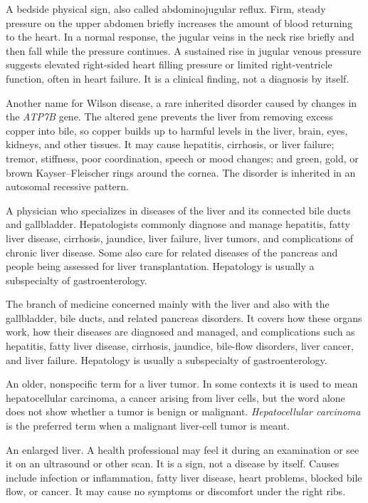  A bedside physical sign, also called abdominojugular reflux. Firm, steady pressure on the upper abdomen briefly increases the amount of blood returning to the heart. In a normal response, the jugular veins in the neck rise briefly and then fall while the pressure continues. A sustained rise in jugular venous pressure suggests elevated right-sided heart filling pressure or limited right-ventricle function, often in heart failure. It is a clinical finding, not a diagnosis by itself.

 Another name for Wilson disease, a rare inherited disorder caused by changes in the \textit{ATP7B} gene. The altered gene prevents the liver from removing excess copper into bile, so copper builds up to harmful levels in the liver, brain, eyes, kidneys, and other tissues. It may cause hepatitis, cirrhosis, or liver failure; tremor, stiffness, poor coordination, speech or mood changes; and green, gold, or brown Kayser--Fleischer rings around the cornea. The disorder is inherited in an autosomal recessive pattern.

 A physician who specializes in diseases of the liver and its connected bile ducts and gallbladder. Hepatologists commonly diagnose and manage hepatitis, fatty liver disease, cirrhosis, jaundice, liver failure, liver tumors, and complications of chronic liver disease. Some also care for related diseases of the pancreas and people being assessed for liver transplantation. Hepatology is usually a subspecialty of gastroenterology.

 The branch of medicine concerned mainly with the liver and also with the gallbladder, bile ducts, and related pancreas disorders. It covers how these organs work, how their diseases are diagnosed and managed, and complications such as hepatitis, fatty liver disease, cirrhosis, jaundice, bile-flow disorders, liver cancer, and liver failure. Hepatology is usually a subspecialty of gastroenterology.

 An older, nonspecific term for a liver tumor. In some contexts it is used to mean hepatocellular carcinoma, a cancer arising from liver cells, but the word alone does not show whether a tumor is benign or malignant. \textit{Hepatocellular carcinoma} is the preferred term when a malignant liver-cell tumor is meant.

 An enlarged liver. A health professional may feel it during an examination or see it on an ultrasound or other scan. It is a sign, not a disease by itself. Causes include infection or inflammation, fatty liver disease, heart problems, blocked bile flow, or cancer. It may cause no symptoms or discomfort under the right ribs.

